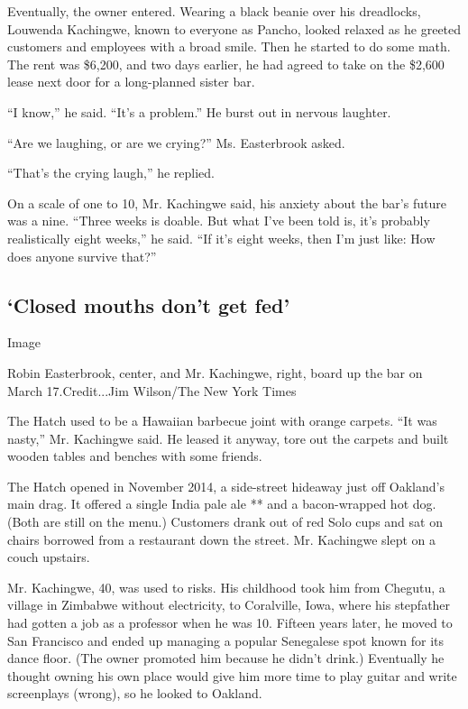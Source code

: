 Eventually, the owner entered. Wearing a black beanie over his
dreadlocks, Louwenda Kachingwe, known to everyone as Pancho, looked
relaxed as he greeted customers and employees with a broad smile. Then
he started to do some math. The rent was \$6,200, and two days earlier,
he had agreed to take on the \$2,600 lease next door for a long-planned
sister bar.

``I know,'' he said. ``It's a problem.'' He burst out in nervous
laughter.

``Are we laughing, or are we crying?'' Ms. Easterbrook asked.

``That's the crying laugh,'' he replied.

On a scale of one to 10, Mr. Kachingwe said, his anxiety about the bar's
future was a nine. ``Three weeks is doable. But what I've been told is,
it's probably realistically eight weeks,'' he said. ``If it's eight
weeks, then I'm just like: How does anyone survive that?''

\hypertarget{closed-mouths-dont-get-fed}{%
\subsection{`Closed mouths don't get
fed'}\label{closed-mouths-dont-get-fed}}

Image

Robin Easterbrook, center, and Mr. Kachingwe, right, board up the bar on
March 17.Credit...Jim Wilson/The New York Times

The Hatch used to be a Hawaiian barbecue joint with orange carpets. ``It
was nasty,'' Mr. Kachingwe said. He leased it anyway, tore out the
carpets and built wooden tables and benches with some friends.

The Hatch opened in November 2014, a side-street hideaway just off
Oakland's main drag. It offered a single India pale ale ** and a
bacon-wrapped hot dog. (Both are still on the menu.) Customers drank out
of red Solo cups and sat on chairs borrowed from a restaurant down the
street. Mr. Kachingwe slept on a couch upstairs.

Mr. Kachingwe, 40, was used to risks. His childhood took him from
Chegutu, a village in Zimbabwe without electricity, to Coralville, Iowa,
where his stepfather had gotten a job as a professor when he was 10.
Fifteen years later, he moved to San Francisco and ended up managing a
popular Senegalese spot known for its dance floor. (The owner promoted
him because he didn't drink.) Eventually he thought owning his own place
would give him more time to play guitar and write screenplays (wrong),
so he looked to Oakland.

